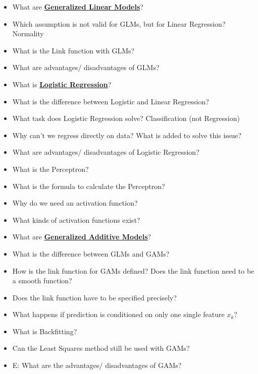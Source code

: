 \documentclass{report}
\begin{document}
\begin{itemize}
	\item What are \textbf{\underline{Generalized Linear Models}}?
	\newline 
	\item Which assumption is not valid for GLMs, but for Linear Regression?
	\newline Normality
	\item What is the Link function with GLMs?
	\newline 
	\item What are advantages/ disadvantages of GLMs?
	\newline 
	
	\item What is \textbf{\underline{Logistic Regression}}?
	\newline 
	\item What is the difference between Logistic and Linear Regression?
	\newline 
	\item What task does Logistic Regression solve?
	\newline Classification (not Regression)
	\item Why can't we regress directly on data? What is added to solve this issue?
	\newline 
	\item What are advantages/ disadvantages of Logistic Regression?
	\newline 
	\item What is the Perceptron?
	\newline 
	\item What is the formula to calculate the Perceptron?
	\newline 
	\item Why do we need an activation function?
	\newline 
	\item What kinds of activation functions exist?
	\newline 
	
	\item What are \textbf{\underline{Generalized Additive Models}}?
	\newline 
	\item What is the difference between GLMs and GAMs?
	\newline 
	\item How is the link function for GAMs defined? Does the link function need to be a smooth function?
	\newline 
	\item Does the link function have to be specified precisely?
	\newline 
	\item What happens if prediction is conditioned on only one single feature $x_k$?
	\newline 
	\item What is Backfitting?
	\newline 
	\item Can the Least Squares method still be used with GAMs?
	\newline 
	\item E: What are the advantages/ disadvantages of GAMs?
	\newline 
	

\end{itemize}
\end{document}
